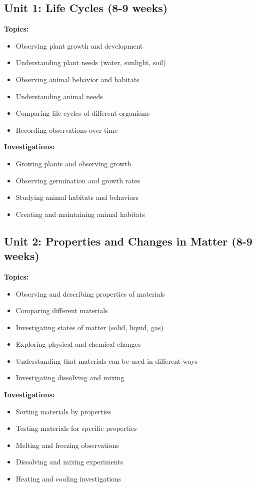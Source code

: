 \documentclass[11pt,letterpaper]{report}
\begin{document}
\subsection{Unit 1: Life Cycles (8-9 weeks)}

\textbf{Topics:}
\begin{itemize}
    \item Observing plant growth and development
    \item Understanding plant needs (water, sunlight, soil)
    \item Observing animal behavior and habitats
    \item Understanding animal needs
    \item Comparing life cycles of different organisms
    \item Recording observations over time
\end{itemize}

\textbf{Investigations:}
\begin{itemize}
    \item Growing plants and observing growth
    \item Observing germination and growth rates
    \item Studying animal habitats and behaviors
    \item Creating and maintaining animal habitats
\end{itemize}

\subsection{Unit 2: Properties and Changes in Matter (8-9 weeks)}

\textbf{Topics:}
\begin{itemize}
    \item Observing and describing properties of materials
    \item Comparing different materials
    \item Investigating states of matter (solid, liquid, gas)
    \item Exploring physical and chemical changes
    \item Understanding that materials can be used in different ways
    \item Investigating dissolving and mixing
\end{itemize}

\textbf{Investigations:}
\begin{itemize}
    \item Sorting materials by properties
    \item Testing materials for specific properties
    \item Melting and freezing observations
    \item Dissolving and mixing experiments
    \item Heating and cooling investigations
\end{itemize}
\end{document}

